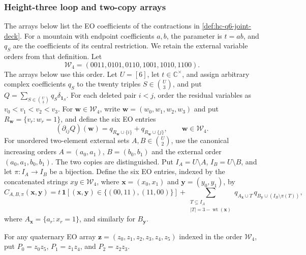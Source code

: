 \documentclass[11pt,letterpaper,onecolumn]{article}
\theoremstyle{plain}
\theoremstyle{definition}
\theoremstyle{remark}
\newcommand{\wt}{\operatorname{wt}}
\newcommand{\one}{\mathbf 1}
\begin{document}
    \subsubsection{Height-three loop and two-copy arrays}
    \label{proofsubsec:cert-high-charge-q6}

The arrays below list the EO coefficients of the contractions in
\cref{def:hc-q6-joint-deck}. For a mountain with endpoint coefficients
\(a,b\), the parameter is \(t=ab\), and \(q_S\) are the coefficients of
its central restriction. We retain the external variable orders from
that definition. Let
	\[
	\mathcal W_4=(0011,0101,0110,1001,1010,1100).
	\]
	The arrays below use this order.  
	Let \(U=[6]\), let \(t\in\mathbb C^\times\), and assign arbitrary complex
	coefficients \(q_S\) to the twenty triples \(S\in\binom U3\), and put
\(Q=\sum_{S\in\binom U3}q_S\delta_{\one_S}\).
For each deleted pair \(i<j\), order the residual variables as
	\(v_0<v_1<v_2<v_3\). For \({\mathbf w}\in\mathcal W_4\), write
	\({\mathbf w}=(w_0,w_1,w_2,w_3)\) and put
	\(R_{\mathbf w}=\{v_r:w_r=1\}\), and define the six EO entries
	\begin{equation}
		(\partial_{ij}Q)({\mathbf w})=q_{R_{\mathbf w}\cup\{i\}}+q_{R_{\mathbf w}\cup\{j\}},
		\qquad {\mathbf w}\in\mathcal W_4.
		\label{eq:cert-q6-loop-array}
	\end{equation}
	For unordered two-element external sets \(A,B\in\binom U2\), use the
	canonical increasing orders \(A=(a_0,a_1)\), \(B=(b_0,b_1)\) and the
external order \((a_0,a_1,b_0,b_1)\). The two copies are distinguished.
Put \(I_A=U\setminus A\),
	\(I_B=U\setminus B\), and let
	\(\pi:I_A\to I_B\) be a bijection.  Define the six EO entries, indexed by
	the concatenated strings \(xy\in\mathcal W_4\), where
	\({\mathbf x}=(x_0,x_1)\) and \({\mathbf y}=(y_0,y_1)\), by
	\begin{equation}
		C_{A,B,\pi}({\mathbf x},{\mathbf y})
		=t\,\one[({\mathbf x},{\mathbf y})\in\{(00,11),(11,00)\}]
		+\sum_{\substack{T\subseteq I_A\\|T|=3-\wt({\mathbf x})}}
		q_{A_{\mathbf x}\cup T}\,
		q_{B_{\mathbf y}\cup(I_B\setminus\pi(T))},
		\label{eq:cert-q6-two-copy-array}
	\end{equation}
	where \(A_{\mathbf x}=\{a_r:x_r=1\}\), and similarly for \(B_{\mathbf y}\).
	
	For any quaternary EO array
	\({\mathbf z}=(z_0,z_1,z_2,z_3,z_4,z_5)\) indexed in the order \(\mathcal W_4\),
	put \(P_0=z_0z_5\), \(P_1=z_1z_4\), and \(P_2=z_2z_3\).
	
\end{document}
